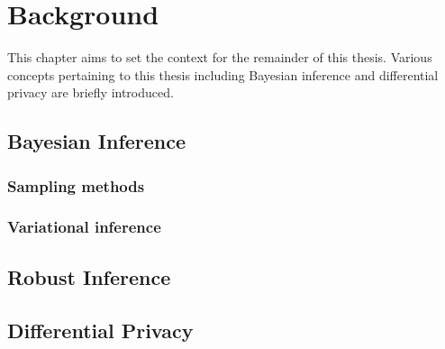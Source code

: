 \chapter{Background}
\label{chap:chap2}

This chapter aims to set the context for the remainder of this thesis. Various concepts pertaining to this thesis including Bayesian inference and differential privacy are briefly introduced.

\section{Bayesian Inference}
\label{sec:bbayesian-inference}

\subsection{Sampling methods}
\label{subsec:bsampling-methods}

\subsection{Variational inference}
\label{subsec:bvariational-inference}

\section{Robust Inference}
\label{sec:brobust-inference}

\section{Differential Privacy}
\label{sec:bdifferential-privacy}






